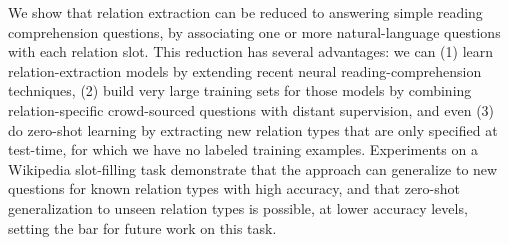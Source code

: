We show that relation extraction can be reduced to answering simple reading comprehension questions, by associating one or more natural-language questions with each relation slot. This reduction has several advantages: we can (1) learn relation-extraction models by extending recent neural reading-comprehension techniques, (2) build very large training sets for those models by combining relation-specific crowd-sourced questions with distant supervision, and even (3) do zero-shot learning by extracting new relation types that are only specified at test-time, for which we have no labeled training examples. Experiments on a Wikipedia slot-filling task demonstrate that the approach can generalize to new questions for known relation types with high accuracy, and that zero-shot generalization to unseen relation types is possible, at lower accuracy levels, setting the bar for future work on this task.

